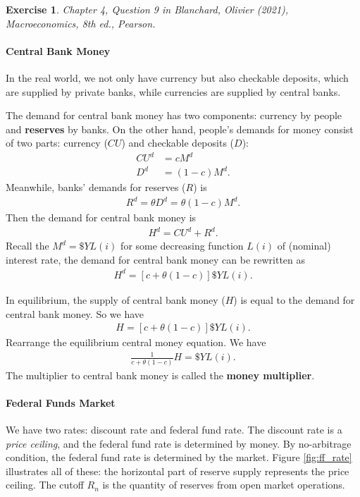 \documentclass[12pt]{article}
\newtheorem{exercise}{Exercise}
\begin{document}
\begin{exercise}
	Chapter 4, Question 9 in Blanchard, Olivier (2021), \textit{Macroeconomics}, 8th ed., Pearson.
\end{exercise}

\paragraph{Central Bank Money}
In the real world, we not only have currency but also checkable deposits, which are supplied by private banks, while currencies are supplied by central banks.

The demand for central bank money has two components: currency by people and \textbf{reserves} by banks. On the other hand, people's demands for money consist of two parts: currency ($CU$) and checkable deposits ($D$):
\begin{align*}
	CU^d &= c M^d\\
    D^d &= (1-c)M^d.
\end{align*}
Meanwhile, banks' demands for reserves ($R$) is
\begin{align*}
	R^d = \theta D^d = \theta (1-c)M^d.
\end{align*}
Then the demand for central bank money is
\begin{align*}
	H^d = CU^d + R^d.
\end{align*}
Recall the $M^d = \$ Y L(i)$ for some decreasing function $L(i)$ of (nominal) interest rate, the demand for central bank money can be rewritten as
\begin{align*}
	H^d = [c + \theta (1-c)]\$ Y L(i).
\end{align*}

In equilibrium, the supply of central bank money ($H$) is equal to the demand for central bank money. So we have
\begin{align*}
	H = [c + \theta (1-c)]\$ Y L(i).
\end{align*}
Rearrange the equilibrium central money equation. We have
\begin{align*}
	\frac{1}{c+\theta (1-c)} H = \$ Y L(i).
\end{align*}
The multiplier to central bank money is called the \textbf{money multiplier}. 

\paragraph{Federal Funds Market}
We have two rates: discount rate and federal fund rate. The discount rate is a \textit{price ceiling}, and the federal fund rate is determined by money. By no-arbitrage condition, the federal fund rate is determined by the market. Figure \ref{fig:ff_rate} illustrates all of these: the horizontal part of reserve supply represents the price ceiling. The cutoff $R_n$ is the quantity of reserves from open market operations.
\end{document}
